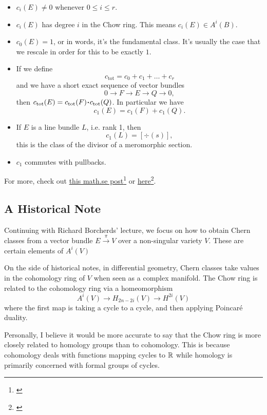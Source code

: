 \documentclass[12pt]{memoir}
\begin{document}
\begin{itemize}
    \item $c_i(E)\neq 0$ whenever $0\leq i\leq r$.
    \item $c_i(E)$ has degree $i$ in the Chow ring. This means $c_i(E)\in A^i(B)$.%
    \item $c_0(E)=1$, or in words, it's the fundamental class. It's usually the case that we rescale in order for this to be exactly $1$.
    \item If we define 
    $$c_{\text{tot}}=c_0+c_1+\dots+c_r$$
    and we have a short exact sequence of vector bundles 
    $$0\to F\to E\to Q\to 0,$$
    then $c_{\text{tot}}(E)=c_{\text{tot}}(F)\.c_{\text{tot}}(Q)$. In particular we have 
    $$c_1(E)=c_1(F)+c_1(Q).$$
    \item If $E$ is a line bundle $L$, i.e. rank 1, then 
    $$c_1(L)=[\div(s)],$$
    this is the class of the divisor of a meromorphic section.
    \item $c_1$ commutes with pullbacks.
\end{itemize}

For more, check out \href{https://math.stackexchange.com/questions/989147/quick-question-chern-classes-of-sym-wedge-hom-and-tensor}{this math.se post}\footnote{\href{math.stackexchange.com/q/989147/}{}} or \href{https://rigtriv.wordpress.com/2009/11/03/chern-classes-part-1/}{here}\footnote{\href{https://rigtriv.wordpress.com/2009/11/03/chern-classes-part-1/}{}}.

\subsection{A Historical Note}

Continuing with Richard Borcherds' lecture, we focus on how to obtain Chern classes from a vector bundle $E\xrightarrow{\pi}V$ over a non-singular variety $V$. These are certain elements of $A^i(V)$

    On the side of historical notes, in differential geometry, Chern classes take values in the cohomology ring of $V$ when seen as a complex manifold. The Chow ring is related to the cohomology ring via a homeomorphism 
    $$A^i(V)\to H_{2n-2i}(V)\to H^{2i}(V)$$
    where the first map is taking a cycle to a cycle, and then applying Poincaré duality.
    
    \begin{Rmk}
        Personally, I believe it would be more accurate to say that the Chow ring is more closely related to homology groups than to cohomology. This is because cohomology deals with functions mapping cycles to $\mathbb{R}$ while homology is primarily concerned with formal groups of cycles. 
    \end{Rmk}
\end{document}
